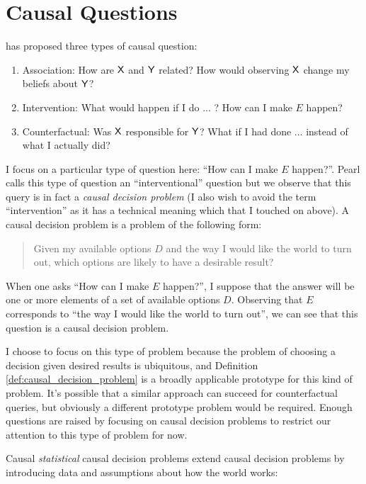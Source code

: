 \section{Causal Questions}

\citet{pearl_book_2018} has proposed three types of causal question:
\begin{enumerate}
    \item Association: How are $\mathsf{X}$ and $\mathsf{Y}$ related? How would observing $\mathsf{X}$ change my beliefs about $\mathsf{Y}$?
    \item Intervention: What would happen if I do ... ? How can I make $E$ happen?
    \item Counterfactual: Was $\mathsf{X}$ responsible for $\mathsf{Y}$? What if I had done ... instead of what I actually did?
\end{enumerate}

I focus on a particular type of question here: ``How can I make $E$ happen?''. Pearl calls this type of question an ``interventional'' question but we observe that this query is in fact a \emph{causal decision problem} (I also wish to avoid the term ``intervention'' as it has a technical meaning which that I touched on above). A causal decision problem is a problem of the following form:

\begin{quote}\label{def:causal_decision_problem}
    Given my available options $D$ and the way I would like the world to turn out, which options are likely to have a desirable result?
\end{quote}

When one asks ``How can I make $E$ happen?'', I suppose that the answer will be one or more elements of a set of available options $D$. Observing that $E$ corresponds to ``the way I would like the world to turn out'', we can see that this question is a causal decision problem.

I choose to focus on this type of problem because the problem of choosing a decision given desired results is ubiquitous, and Definition \ref{def:causal_decision_problem} is a broadly applicable prototype for this kind of problem. It's possible that a similar approach can succeed for counterfactual queries, but obviously a different prototype problem would be required. Enough questions are raised by focusing on causal decision problems to restrict our attention to this type of problem for now.

Causal \emph{statistical} causal decision problems extend causal decision problems by introducing data and assumptions about how the world works:

